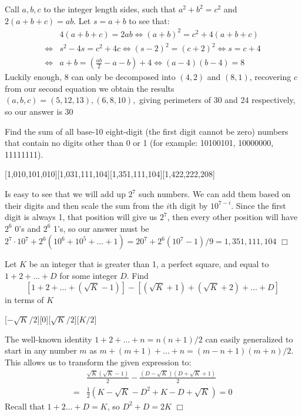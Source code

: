 \begin{solution}[30]
    Call $a,b,c$ to the integer length sides, such that $a^2+b^2=c^2$ and $2(a+b+c)=ab$. Let $s=a+b$ to see that:
    \begin{align*}
        & 4(a+b+c) = 2ab \iff (a+b)^2 = c^2 + 4(a+b+c) \\
        \iff& s^2 -4s= c^2+4c \iff (s-2)^2 = (c+2)^2 \iff s=c+4 \\
        \iff& a+b = \left( \frac{ab}{2} -a - b\right) + 4 \iff (a-4)(b-4) = 8
    \end{align*}
    Luckily enough, $8$ can only be decomposed into $(4,2)$ and $(8,1)$, recovering $c$ from our second equation we obtain the results $(a,b,c) =  (5,12,13),(6,8,10),$ giving perimeters of 30 and 24 respectively, so our answer is 30
\end{solution}

\begin{problem}
    Find the sum of all base-10 eight-digit (the first digit cannot be zero) numbers that contain no digits other than 0 or 1 (for example: 10100101, 10000000, 11111111).
\end{problem}
[1,010,101,010][1,031,111,104][1,351,111,104][1,422,222,208]

\begin{solution}[D]
    Is easy to see that we will add up $2^7$ such numbers. We can add them based on their digits and then scale the sum from the $i$th digit by $10^{7-i}$. Since the first digit is always 1, that position will give us $2^7$, then every other position will have $2^6$ 0's and $2^6$ 1's, so our answer must be $2^7 \cdot 10^7 + 2^6 ( 10^6+10^5 + \ldots + 1) = 20^7 + 2^6(10^7-1)/9 = 1,351,111,104$ $\Box$ 
\end{solution}
\begin{problem}
    Let $K$ be an integer that is greater than 1, a perfect square, and equal to $1+2+\ldots+D$ for some integer $D$. Find 
    $$\left[ 1+2+\ldots+ (\sqrt{K} - 1)\right] - \left[ (\sqrt{K}+1) + (\sqrt{K} + 2) + \ldots + D\right]$$
    in terms of $K$
\end{problem}
[$-\sqrt{K} / 2$][0][$\sqrt{K} / 2$][$K / 2$]

\begin{solution}[C]
    The well-known identity $1 + 2 + \ldots + n = n(n+1)/2$ can easily generalized to start in any number $m$ as $m + (m+1 ) + \ldots + n = (m-n+1)(m+n)/2$. This allows us to transform the given expression to:
    \begin{align*}
        &\frac{\sqrt{K} \left( \sqrt{K} - 1\right)}{2} - \frac{\left( D - \sqrt{K} \right) \left( D + \sqrt{K} + 1 \right) }{2} \\
        =& \frac{1}{2} \left( K - \sqrt{K} - D^2 + K - D + \sqrt{K}\right) = \boxed{0}
    \end{align*}
    Recall that $1+2 \ldots + D = K$, so $D^2 + D = 2K$ $\Box$
\end{solution}

